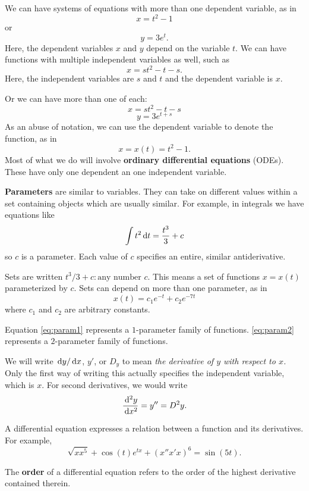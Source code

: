 We can have systems of equations with more than one dependent variable, as in
\[ x =t^2 -1 \]
or
\[ y=3e^t. \]
Here, the dependent variables $x$ and $y$ depend on the variable $t$.
We can have functions with multiple independent variables as well, such as
\[ x=st^2 -t -s. \]
Here, the independent variables are $s$ and $t$ and the dependent variable is $x$.

Or we can have more than one of each:
\[ x =st^2 -t -s \]
\[ y=3e^{t+s} \]
As an abuse of notation, we can use the dependent variable to denote the function, as in
\[ x=x(t)=t^2 -1.\]
Most of what we do will involve \textbf{ordinary differential equations} (ODEs).
These have only one dependent an one independent variable.

\textbf{Parameters} are similar to variables.
They can take on different values within a set containing objects which are usually similar.
For example, in integrals we have equations like
\begin{equation}
  \int t^2 \,\mathrm{d} t = \frac{t^3}{3}+c
  \label{eq:param1}
\end{equation}
so $c$ is a parameter. Each value of $c$ specifies an entire, similar antiderivative.

Sets are written ${t^3 /3 +c : \text{any number $c$}}$.
This means a set of functions $x=x(t)$ parameterized by $c$.
Sets can depend on more than one parameter, as in
\begin{equation}
  x(t)=c_1 e^{-t}+c_2 e^{-7t}
  \label{eq:param2}
\end{equation}
where $c_1$ and $c_2$ are arbitrary constants.

Equation \eqref{eq:param1} represents a $1$-parameter family of functions.
\eqref{eq:param2} represents a $2$-parameter family of functions.

We will write $\,\mathrm{d} y / \,\mathrm{d} x$, $y'$, or $D_y$ to mean \emph{the derivative of $y$ with respect to $x$.}
  Only the first way of writing this actually specifies the independent variable, which is $x$.
For second derivatives, we would write
\[ \frac{\,\mathrm{d} ^2 y}{\,\mathrm{d} x^2}= y''=D^2 y. \]

A differential equation expresses a relation between a function and its derivatives.
For example,
\[ \sqrt{x x^{5}}+\cos{(t)}e^{tx} + (x'' x' x )^6 = \sin{(5t)}. \]

The \textbf{order} of a differential equation refers to the order of the highest derivative contained therein.


